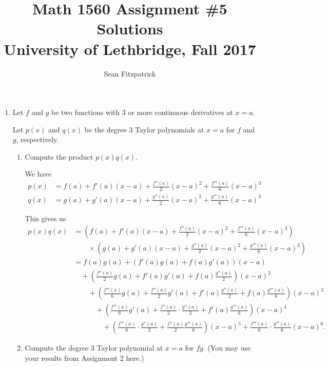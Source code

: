 \documentclass[letterpaper,12pt]{article}
\title{Math 1560 Assignment \#5 Solutions\\University of Lethbridge, Fall 2017}
\author{Sean Fitzpatrick}
\begin{document}
 \maketitle


\begin{enumerate}
\item Let $f$ and $g$ be two functions with 3 or more continuous derivatives at $x=a$.

Let $p(x)$ and $q(x)$ be the degree 3 Taylor polynomials at $x=a$ for $f$ and $g$, respectively. 

\begin{enumerate}
\item Compute the product $p(x)q(x)$.

\medskip

We have 
\begin{align*}
p(x) & = f(a)+f'(a)(x-a)+\frac{f''(a)}{2}(x-a)^2+\frac{f'''(a)}{6}(x-a)^3\\
q(x) & = g(a)+g'(a)(x-a)+\frac{g''(a)}{2}(x-a)^2+\frac{g'''(a)}{6}(x-a)^3
\end{align*}

This gives us
\begin{align*}
p(x)q(x) & = \left(f(a)+f'(a)(x-a)+\frac{f''(a)}{2}(x-a)^2+\frac{f'''(a)}{6}(x-a)^3\right)\\
&\quad\quad \times\left(g(a)+g'(a)(x-a)+\frac{g''(a)}{2}(x-a)^2+\frac{g'''(a)}{6}(x-a)^3\right)\\
 & = f(a)g(a)+(f'(a)g(a)+f(a)g'(a))(x-a)\\
 & \quad +\left(\frac{f''(a)}{2}g(a)+f'(a)g'(a)+f(a)\frac{g''(a)}{2}\right)(x-a)^2 \\
 &\quad \quad + \left(\frac{f'''(a)}{6}g(a) + \frac{f''(a)}{2}g'(a)+f'(a)\frac{g''(a)}{2}+f(a)\frac{g'''(a)}{6}\right)(x-a)^3\\
 &\quad\quad\quad + \left(\frac{f'''(a)}{6}g'(a)+\frac{f''(a)}{2}\cdot\frac{g''(a)}{2}+f'(a)\frac{g'''(a)}{6}\right)(x-a)^4\\ 
 &\quad\quad\quad\quad + \left(\frac{f'''(a)}{6}\cdot \frac{g''(a)}{2} + \frac{f''(a)}{2}\frac{g'''(a)}{6}\right)(x-a)^5 + \frac{f'''(a)}{6}\cdot \frac{g'''(a)}{6}(x-a)^6.
\end{align*}

\bigskip

\item Compute the degree 3 Taylor polynomial at $x=a$ for $fg$. (You may use your results from Assignment 2 here.)

\medskip


\end{enumerate}
\end{enumerate}
\end{document}

